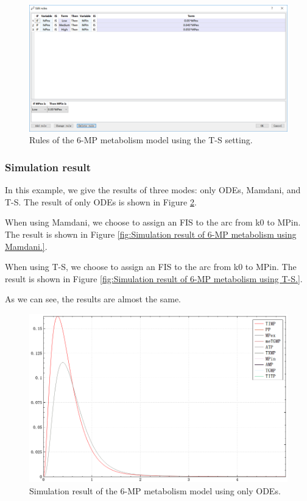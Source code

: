 \documentclass[journal,a4paper,onecolumn]{article}
\begin{document}
\begin{figure}[!hbt]
	\begin{center}
		\includegraphics[width=\columnwidth]{fig60}
		\caption{Rules of the 6-MP metabolism model using the T-S setting.}
		\label{fig:Rules of 6-MP metabolism using T-S.}
	\end{center}
\end{figure}


\subsubsection{Simulation result}
In this example, we give the results of three modes: only ODEs, Mamdani, and T-S. The result of only ODEs is shown in Figure \ref{fig:Simulation result of 6-MP metabolism using only ODEs.}.

When using Mamdani, we choose to assign an FIS to the arc from k0 to MPin. The result is shown in Figure \ref{fig:Simulation result of 6-MP metabolism using Mamdani.}.

When using T-S, we choose to assign an FIS to the arc from k0 to MPin. The result is shown in Figure \ref{fig:Simulation result of 6-MP metabolism using T-S.}.

As we can see, the results are almost the same.

\begin{figure}[!hbt]
	\begin{center}
		\includegraphics[width=\columnwidth]{fig54}
		\caption{Simulation result of the 6-MP metabolism model using only ODEs.}
		\label{fig:Simulation result of 6-MP metabolism using only ODEs.}
	\end{center}
\end{figure}
\end{document}
